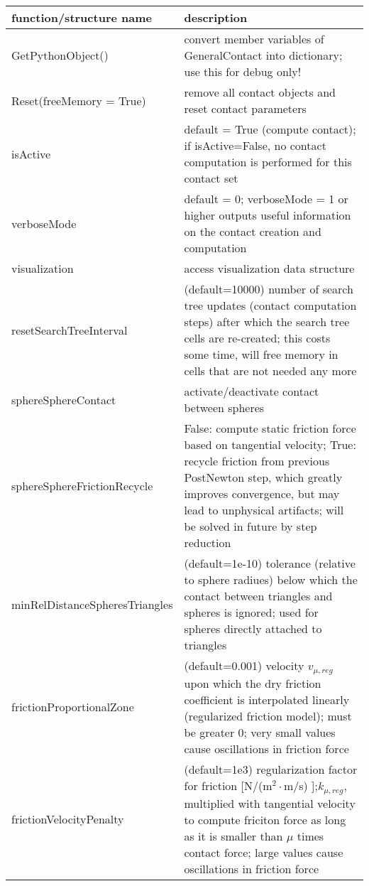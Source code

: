 \begin{center}
\footnotesize
\begin{longtable}{| p{8cm} | p{8cm} |} 
\hline
{\bf function/structure name} & {\bf description}\\ \hline
  GetPythonObject() & convert member variables of GeneralContact into dictionary; use this for debug only!\\ \hline 
  Reset(freeMemory = True) & remove all contact objects and reset contact parameters\\ \hline 
  isActive & default = True (compute contact); if isActive=False, no contact computation is performed for this contact set \\ \hline  
  verboseMode & default = 0; verboseMode = 1 or higher outputs useful information on the contact creation and computation \\ \hline  
  visualization & access visualization data structure \\ \hline  
  resetSearchTreeInterval & (default=10000) number of search tree updates (contact computation steps) after which the search tree cells are re-created; this costs some time, will free memory in cells that are not needed any more \\ \hline  
  sphereSphereContact & activate/deactivate contact between spheres \\ \hline  
  sphereSphereFrictionRecycle & False: compute static friction force based on tangential velocity; True: recycle friction from previous PostNewton step, which greatly improves convergence, but may lead to unphysical artifacts; will be solved in future by step reduction \\ \hline  
  minRelDistanceSpheresTriangles & (default=1e-10) tolerance (relative to sphere radiues) below which the contact between triangles and spheres is ignored; used for spheres directly attached to triangles \\ \hline  
  frictionProportionalZone & (default=0.001) velocity $v_{\mu,reg}$ upon which the dry friction coefficient is interpolated linearly (regularized friction model); must be greater 0; very small values cause oscillations in friction force \\ \hline  
  frictionVelocityPenalty & (default=1e3) regularization factor for friction [N/(m$^2 \cdot$m/s) ];$k_{\mu,reg}$, multiplied with tangential velocity to compute friciton force as long as it is smaller than $\mu$ times contact force; large values cause oscillations in friction force \\ \hline  

\end{longtable}
\end{center}
